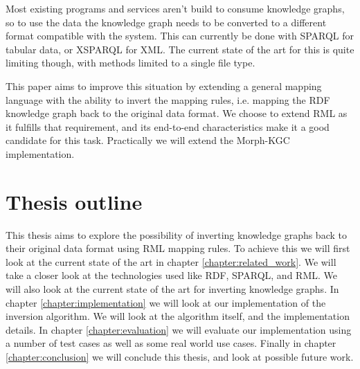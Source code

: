 Most existing programs and services aren't build to consume knowledge graphs, so to use the data the knowledge graph needs to be converted to a different format compatible with the system. This can currently be done with SPARQL \citep{Seaborne:08:SQL} for tabular data, or XSPARQL \citep{Bischof2012} for XML. The current state of the art for this is quite limiting though, with methods limited to a single file type.

This paper aims to improve this situation by extending a general mapping language with the ability to invert the mapping rules, i.e. mapping the RDF knowledge graph back to the original data format. We choose to extend RML \citep{dimou_ldow_2014} as it fulfills that requirement, and its end-to-end characteristics make it a good candidate for this task. Practically we will extend the Morph-KGC \citep{arenas2022morph} implementation.


\section{Thesis outline}
This thesis aims to explore the possibility of inverting knowledge graphs back to their original data format using RML mapping rules. To achieve this we will first look at the current state of the art in chapter \ref{chapter:related_work}. We will take a closer look at the technologies used like RDF, SPARQL, and RML. We will also look at the current state of the art for inverting knowledge graphs. In chapter \ref{chapter:implementation} we will look at our implementation of the inversion algorithm. We will look at the algorithm itself, and the implementation details. In chapter \ref{chapter:evaluation} we will evaluate our implementation using a number of test cases as well as some real world use cases. Finally in chapter \ref{chapter:conclusion} we will conclude this thesis, and look at possible future work.